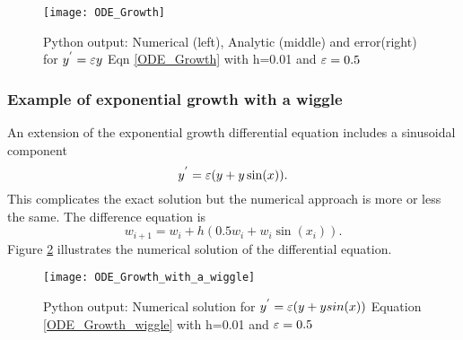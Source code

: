 \begin{figure}[H]
\centering
\texttt{[image: ODE\_Growth]}
\caption{Python output: Numerical (left), Analytic (middle) and error(right) for $y^{'}=\varepsilon y$  Eqn \ref{ODE_Growth} with h=0.01 and $\varepsilon=0.5$}
\label{GROWTH ODE Figure}
\end{figure}
\subsubsection{Example of exponential growth with a wiggle}

\begin{example}
An extension of the exponential growth differential equation includes a sinusoidal component 
\begin{equation}\label{ODE_Growth_wiggle} y^{'}=\varepsilon (y+y \sin(x)). \end{equation}
This complicates the exact solution but the numerical approach is more or less the same.
The difference equation is 
\[w_{i+1}=w_i+h(0.5w_i+w_i\sin(x_i)). \]
Figure \ref{GROWTH ODE WIGGLE} illustrates the numerical solution of the differential equation.
\end{example}

\begin{figure}[H]
\centering
\texttt{[image: ODE\_Growth\_with\_a\_wiggle]}
\caption{Python output: Numerical solution for $y^{'}=\varepsilon (y+y sin(x))$ Equation \ref{ODE_Growth_wiggle} with h=0.01 and $\varepsilon=0.5$}
\label{GROWTH ODE WIGGLE}
\end{figure}


